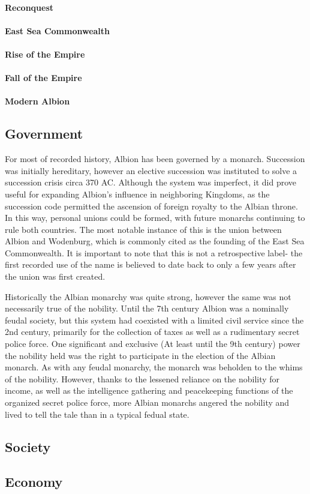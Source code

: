 	\paragraph{Reconquest}

	\paragraph{East Sea Commonwealth}

	\paragraph{Rise of the Empire}

	\paragraph{Fall of the Empire}

	\paragraph{Modern Albion}


\subsection{Government}
	
	For most of recorded history, Albion has been governed by a monarch.  Succession was initially hereditary, however an elective succession was instituted to solve a succession crisis circa 370 AC.  Although the system was imperfect, it did prove useful for expanding Albion's influence in neighboring Kingdoms, as the succession code permitted the ascension of foreign royalty to the Albian throne.  In this way, personal unions could be formed, with future monarchs continuing to rule both countries.  The most notable instance of this is the union between Albion and Wodenburg, which is commonly cited as the founding of the East Sea Commonwealth.  It is important to note that this is not a retrospective label- the first recorded use of the name is believed to date back to only a few years after the union was first created.
	
	Historically the Albian monarchy was quite strong, however the same was not necessarily true of the nobility.  Until the 7th century Albion was a nominally feudal society, but this system had  coexisted with a limited civil service since the 2nd century, primarily for the collection of taxes as well as a rudimentary secret police force.  One significant and exclusive (At least until the 9th century) power the nobility held was the right to participate in the election of the Albian monarch.  As with any feudal monarchy, the monarch was beholden to the whims of the nobility.  However, thanks to the lessened reliance on the nobility for income, as well as the intelligence gathering and peacekeeping functions of the organized secret police force, more Albian monarchs angered the nobility and lived to tell the tale than in a typical fedual state.

\subsection{Society}

\subsection{Economy}